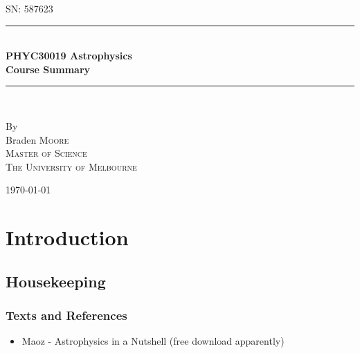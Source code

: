\documentclass[a4paper]{article} %
\begin{document}
\pagestyle{empty}

\newcommand{\HRule}{\rule{\linewidth}{0.5mm}}

\begin{titlepage}

    \begin{center}
        \textsc{\large SN: 587623}\\[6cm]

        \HRule \\[0.5cm]
		\Huge \textbf{PHYC30019 Astrophysics}\\[0.5cm]
        \huge \textbf{Course Summary}\\[0.5cm] 
        \HRule \\[1.5cm]
        \begin{minipage}{0.4\textwidth}
        \begin{center}

        \large By \\[0.75cm]
        \huge Braden \scshape Moore \\[0.5cm]
        \normalsize \normalfont Master of Science \\
        The University of Melbourne \\

        \end{center}
        \end{minipage}

        \vfill

        \large \today
    \end{center}


\newpage
\end{titlepage}
\pagestyle{empty}

\pagestyle{fancy}
\lfoot{\textsc{\today}}
\setcounter{page}{1}
\section{Introduction}
\subsection{Housekeeping}
\subsubsection{Texts and References}
\begin{itemize}
\item Maoz - Astrophysics in a Nutshell (free download apparently)
\end{itemize}
\end{document}
